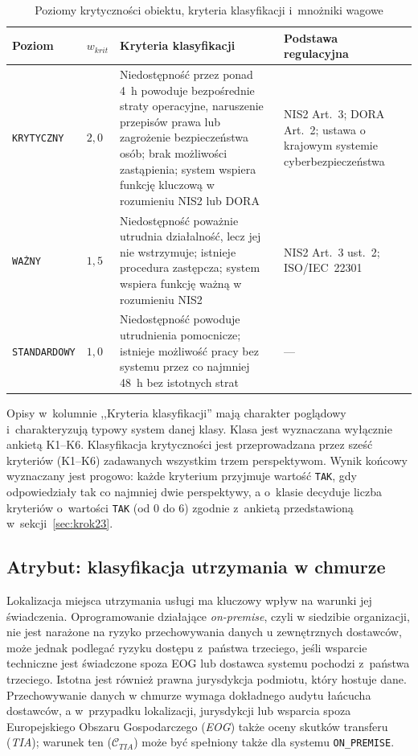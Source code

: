 \begin{table}[H]
\centering
\caption{Poziomy krytyczności obiektu, kryteria klasyfikacji 
         i~mnożniki wagowe}
\label{tab:krytycznosc}
\renewcommand{\arraystretch}{1.5}
\begin{tabular}{p{2.8cm}p{1.5cm}p{4.5cm}p{4cm}}
\toprule
\textbf{Poziom} & \textbf{$w_{krit}$}
& \textbf{Kryteria klasyfikacji}
& \textbf{Podstawa regulacyjna} \\
\midrule
\texttt{KRYTYCZNY} & $2{,}0$ 
& Niedostępność przez ponad 4~h powoduje bezpośrednie straty 
  operacyjne, naruszenie przepisów prawa lub zagrożenie 
  bezpieczeństwa osób; brak możliwości zastąpienia; 
  system wspiera funkcję kluczową w rozumieniu NIS2 lub DORA
& NIS2 Art.~3; DORA Art.~2; 
  ustawa o krajowym systemie cyberbezpieczeństwa \\
\midrule
\texttt{WAŻNY} & $1{,}5$ 
& Niedostępność poważnie utrudnia działalność, lecz jej 
  nie wstrzymuje; istnieje procedura zastępcza; 
  system wspiera funkcję ważną w rozumieniu NIS2
& NIS2 Art.~3 ust.~2; 
  ISO/IEC~22301 \\
\midrule
\texttt{STANDARDOWY} & $1{,}0$ 
& Niedostępność powoduje utrudnienia pomocnicze; 
  istnieje możliwość pracy bez systemu przez 
  co najmniej 48~h bez istotnych strat
& --- \\
\bottomrule
\end{tabular}
\end{table}

Opisy w~kolumnie ,,Kryteria klasyfikacji'' mają charakter poglądowy i~charakteryzują typowy system danej klasy. Klasa jest wyznaczana wyłącznie ankietą K1--K6. Klasyfikacja krytyczności jest przeprowadzana przez sześć kryteriów (K1--K6) zadawanych wszystkim trzem perspektywom. Wynik końcowy wyznaczany jest progowo: każde kryterium przyjmuje wartość \texttt{TAK}, gdy odpowiedziały tak co najmniej dwie perspektywy, a o~klasie decyduje liczba kryteriów o~wartości \texttt{TAK} (od 0 do 6) zgodnie z~ankietą przedstawioną w~sekcji~\ref{sec:krok23}.

\subsection{Atrybut: klasyfikacja utrzymania w chmurze}
\label{sec:klasyfikacja-chmura}
Lokalizacja miejsca utrzymania usługi ma kluczowy wpływ na warunki jej świadczenia. Oprogramowanie działające \textit{on-premise}, czyli w siedzibie organizacji, nie jest narażone na ryzyko przechowywania danych u zewnętrznych dostawców, może jednak podlegać ryzyku dostępu z~państwa trzeciego, jeśli wsparcie techniczne jest świadczone spoza EOG lub dostawca systemu pochodzi z~państwa trzeciego. Istotna jest również prawna jurysdykcja podmiotu, który hostuje dane. Przechowywanie danych w chmurze wymaga dokładnego audytu łańcucha dostawców, a w~przypadku lokalizacji, jurysdykcji lub wsparcia spoza Europejskiego Obszaru Gospodarczego (\textit{EOG}) także oceny skutków transferu (\textit{TIA}); warunek ten ($\mathcal{C}_{TIA}$) może być spełniony także dla systemu \texttt{ON\_PREMISE}.

